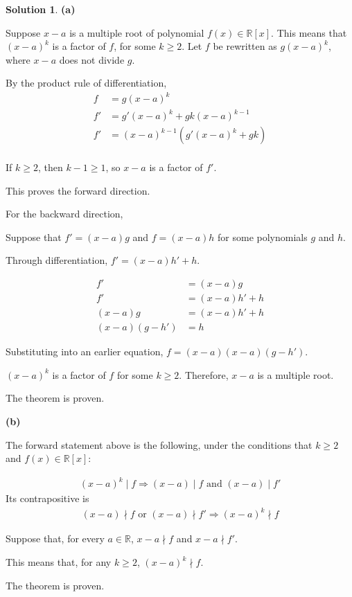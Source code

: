 \documentclass[12pt]{article}
\theoremstyle{definition}
\newtheorem*{soln}{Solution}
\newcommand{\RR}{{\mathbb{R}}}
\begin{document}
\begin{soln}

\textbf{(a)}

Suppose $x-a$ is a multiple root of polynomial $f(x)\in\RR[x]$.
This means that $(x-a)^k$ is a factor of $f$, for some $k\geq2$.
Let $f$ be rewritten as $g(x-a)^k$,
where $x-a$ does not divide $g$.

By the product rule of differentiation,
\begin{align*}
f&=g(x-a)^k\\
f'&=g'(x-a)^k + gk(x-a)^{k-1}\\
f'&=(x-a)^{k-1}(g'(x-a)^k+gk)\\
\end{align*}

If $k\geq 2$, then $k-1\geq 1$, so $x-a$ is a factor of $f'$.

This proves the forward direction.

For the backward direction,

Suppose that $f'=(x-a)g$ and $f=(x-a)h$ for some polynomials $g$ and $h$.

Through differentiation, $f'=(x-a)h'+h$.

\begin{align*}
f'&=(x-a)g\\
f'&=(x-a)h'+h\\
(x-a)g&=(x-a)h'+h\\
(x-a)(g-h')&=h
\end{align*}


Substituting into an earlier equation,
$f=(x-a)(x-a)(g-h')$.

$(x-a)^k$ is a factor of $f$ for some $k\geq 2$.
Therefore, $x-a$ is a multiple root.

The theorem is proven.

\textbf{(b)}

The forward statement above is the following, under the conditions
that $k\geq 2$ and $f(x)\in\RR[x]$:

\renewcommand{\land}{\text{ and }}
\renewcommand{\lor}{\text{ or }}

\begin{gather*}
(x-a)^k\mid f \Longrightarrow (x-a)\mid f\land (x-a)\mid f'
\end{gather*}
Its contrapositive is
\begin{gather*}
(x-a)\nmid f\lor (x-a)\nmid f' \Longrightarrow (x-a)^k\nmid f
\end{gather*}

Suppose that, for every $a\in \RR$, $x-a\nmid f$ and $x-a\nmid f'$.

This means that, for any $k\geq 2$, $(x-a)^k\nmid f$.

The theorem is proven.

\end{soln}
\end{document}

